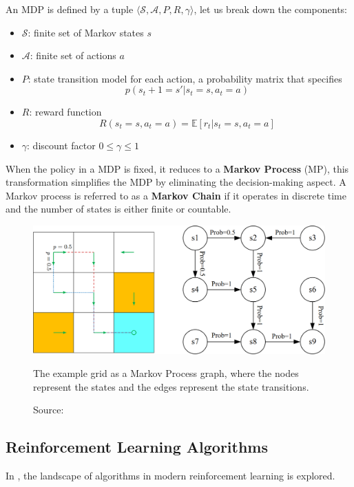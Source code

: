 \vspace{3cm}

An MDP is defined by a tuple \( \langle \mathcal{S}, \mathcal{A}, P, R, \gamma \rangle \),
let us break down the components:
\begin{itemize}
    \item \( \mathcal{S} \): finite set of Markov states $s$
    \item \( \mathcal{A} \): finite set of actions $a$
    \item \( P \): state transition model for each action,
    a probability matrix that specifies $$p(s_t+1 = s'|s_t=s, a_t=a)$$
    \item \( R \): reward function
    $$ R(s_t=s, a_t=a) = \mathbb{E} [r_t | s_t = s, a_t = a] $$
    \item \( \gamma \): discount factor $0 \leq \gamma \leq 1$
\end{itemize}

When the policy in a MDP is fixed, it reduces to a \textbf{Markov Process} (MP),
this transformation simplifies the MDP by eliminating the decision-making aspect. 
A Markov process is referred to as a \textbf{Markov Chain} if it operates in discrete
time and the number of states is either finite or countable.

\begin{figure}[h]
    \centering
    \includegraphics[width=.75\textwidth]{figures/ch3/3.mdp.png}
    \caption{The example grid as a Markov Process graph, where the nodes
    represent the states and the edges represent the state transitions.}
    \vspace{-10px}
    \caption*{\scriptsize{Source: \cite{zhao2024RLBook}}}
    \label{fig:mdp}
\end{figure}


\subsection{Reinforcement Learning Algorithms}

In \cite{openaiPartKinds}, the landscape of algorithms in modern reinforcement
learning is explored.


